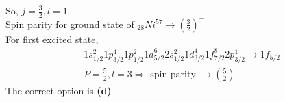 \begin{enumerate}
\begin{answer}
	So, $j=\frac{3}{2}, l=1$\\
	Spin parity for ground state of ${ }_{28} N i^{57} \rightarrow\left(\frac{3}{2}\right)^{-}$\\
	For first excited state,\\
	\begin{align*}
		&1 s_{1 / 2}^{2} 1 p_{3 / 2}^{4} 1 p_{1 / 2}^{2} 1 d_{5 / 2}^{6} 2 s_{1 / 2}^{2} 1 d_{3 / 2}^{4} 1 f_{7 / 2}^{8} 2 p_{3 / 2}^{1} \rightarrow 1 f_{5 / 2} \\
		&P=\frac{5}{2}, l=3 \Rightarrow \text { spin parity } \rightarrow\left(\frac{5}{2}\right)^{-}
	\end{align*}
The correct option is \textbf{(d)}
\end{answer}

\end{enumerate}

